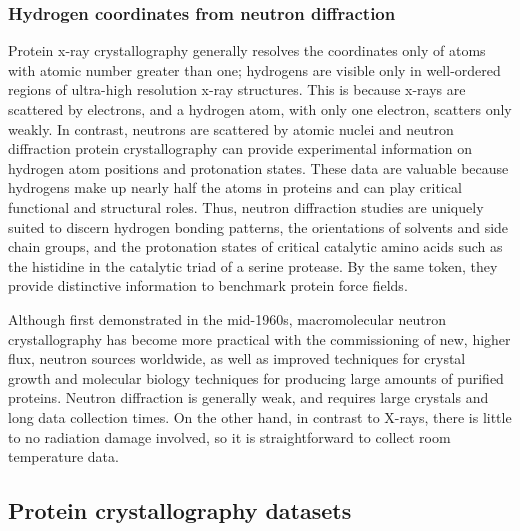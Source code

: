 \documentclass[9pt,review]{livecoms}
\begin{document}
\subsubsection{Hydrogen coordinates from neutron diffraction}
\label{sub2:neutron}

Protein x-ray crystallography generally resolves the coordinates only of atoms with atomic number greater than one; hydrogens are visible only in well-ordered regions of ultra-high resolution x-ray structures.
This is because x-rays are scattered by electrons, and a hydrogen atom, with only one electron, scatters only weakly.
In contrast, neutrons are scattered by atomic nuclei and neutron diffraction protein crystallography can provide experimental information on hydrogen atom positions and protonation states.
These data are valuable because hydrogens make up nearly half the atoms in proteins and can play critical functional and structural roles.
Thus, neutron diffraction studies are uniquely suited to discern hydrogen bonding patterns, the orientations of solvents and side chain groups, and the protonation states of critical catalytic amino acids such as the histidine in the catalytic triad of a serine protease.
By the same token, they provide distinctive information to benchmark protein force fields.

Although first demonstrated in the mid-1960s, macromolecular neutron crystallography has become more practical with the commissioning of new, higher flux, neutron sources worldwide, as well as improved techniques for crystal growth and molecular biology techniques for producing large amounts of purified proteins.
Neutron diffraction is generally weak, and requires large crystals and long data collection times.
On the other hand, in contrast to X-rays, there is little to no radiation damage involved, so it is straightforward to collect room temperature data.

\subsection{Protein crystallography datasets}
\label{sub:xtal_data}
\end{document}
